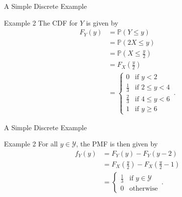 \documentclass[10pt]{beamer}
\begin{document}
\begin{frame}[fragile]{A Simple Discrete Example}
\begin{exampleblock}{Example 2}
The CDF for \(Y\) is given by
\begin{equation*}
\begin{aligned}
    F_Y\left(y\right) &= \mathbb{P}\left(Y \leq y\right)\\
    &= \mathbb{P}\left(2X \leq y\right)\\
    &= \mathbb{P}\left(X \leq \frac{y}{2}\right)\\
    &= F_X\left(\frac{y}{2}\right)\\
    &= \begin{cases}
        0 & \textrm{if } y < 2\\
        \frac{1}{3} & \textrm{if } 2 \leq y < 4\\
        \frac{2}{3} & \textrm{if } 4 \leq y < 6\\
        1 & \textrm{if } y \geq 6
    \end{cases}\,.
\end{aligned}
\end{equation*}
\end{exampleblock}
\end{frame}

\begin{frame}[fragile]{A Simple Discrete Example}
\begin{exampleblock}{Example 2}
For all \(y\in\mathcal{Y}\), the PMF is then given by
\begin{equation*}
\begin{aligned}
    f_Y\left(y\right) &= F_Y\left(y\right) - F_Y\left(y - 2\right)\\
    &= F_X\left(\frac{y}{2}\right) - F_X\left(\frac{y}{2} - 1\right)\\
    &= \begin{cases}
        \frac{1}{3} & \textrm{if } y\in\mathcal{Y}\\
        0 & \textrm{otherwise}
    \end{cases}\,.
\end{aligned}
\end{equation*}
\end{exampleblock}
\end{frame}
\end{document}
